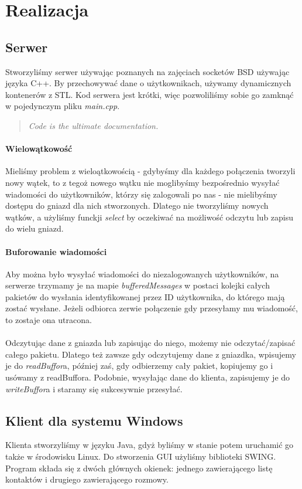 \documentclass[10pt,a4paper]{article}
\begin{document}
\section{Realizacja}
	\subsection{Serwer}Stworzyliśmy serwer używając poznanych na zajęciach socketów BSD używając języka C++.
	By przechowywać dane o użytkownikach, używamy dynamicznych kontenerów z STL.
	Kod serwera jest krótki, więc pozwoliliśmy sobie go zamknąć w pojedynczym pliku \textit{main.cpp}.
	\begin{quote}
		\textit{Code is the ultimate documentation.}
	\end{quote}
	\paragraph{Wielowątkowość}Mieliśmy problem z wieloątkowością - gdybyśmy dla każdego połączenia tworzyli
	nowy wątek, to z tegoż nowego wątku nie moglibyśmy bezpośrednio wysyłać wiadomości do użytkowników, którzy
	się zalogowali po nas - nie mielibyśmy dostępu do gniazd dla nich stworzonych. Dlatego nie tworzyliśmy nowych
	wątków, a użyliśmy funckji \textit{select} by oczekiwać na możliwość odczytu lub zapisu do wielu gniazd.
	\paragraph{Buforowanie wiadomości}Aby można było wysyłać wiadomości do niezalogowanych użytkowników, na serwerze
	trzymamy je na mapie \textit{bufferedMessages} w postaci kolejki całych pakietów do wysłania identyfikowanej przez
	ID użytkownika, do którego mają zostać wysłane. Jeżeli odbiorca zerwie połączenie gdy przesyłamy mu wiadomość, to
	zostaje ona utracona.
	\paragraph{}Odczytując dane z gniazda lub zapisując do niego, możemy nie odczytać/zapisać całego pakietu.
	Dlatego też zawsze gdy odczytujemy dane z gniazdka, wpisujemy je do \textit{readBuffor}a, później zaś, gdy
	odbierzemy cały pakiet, kopiujemy go i usówamy z readBuffora. Podobnie, wysyłając dane do klienta, zapisujemy je do
	\textit{writeBuffor}a i staramy się sukcesywnie przesyłać.
	
	\subsection{Klient dla systemu Windows}Klienta stworzyliśmy w języku Java, gdyż byliśmy w stanie potem uruchamić go także w środowisku
	Linux. Do stworzenia GUI użyliśmy biblioteki SWING. Program składa się z dwóch głównych okienek: jednego 
	zawierającego listę kontaktów i drugiego zawierającego rozmowy.
\end{document}

